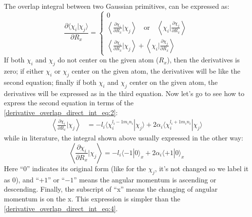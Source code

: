 The overlap integral between two Gaussian primitives, can be expressed as:
\begin{equation}
 \label{derivative_overlap_direct_int_eq:3}
\frac{\partial\langle\chi_{i}|\chi_{j}\rangle}{\partial R_{x}} = 
\begin{cases}
 0  \\
\left\langle \frac{\partial \chi_{i} }{\partial R_{x}}|\chi_{j}\right\rangle \quad \text{or}
\quad \left\langle \chi_{i}|\frac{\partial \chi_{j} }{\partial R_{x}}\right\rangle \\
\left\langle \frac{\partial \chi_{i} }{\partial R_{x}}|\chi_{j}\right\rangle +
\left\langle \chi_{i}|\frac{\partial \chi_{j} }{\partial R_{x}}\right\rangle
\end{cases}
\end{equation}
If both $\chi_{i}$ and $\chi_{j}$ do not center on the given atom ($R_{x}$), then the derivatives
is zero; if either $\chi_{i}$ or $\chi_{j}$ center on the given atom, the derivatives will be like
the second equation; finally if both $\chi_{i}$ and $\chi_{j}$ center on the given atom, the 
derivatives will be expressed as in the third equation. Now let's go to see how to express the 
second equation in terms of the \ref{derivative_overlap_direct_int_eq:2}:
\begin{equation}
 \begin{split}
  \left\langle \frac{\partial \chi_{i} }{\partial R_{x}}|\chi_{j}\right\rangle &=
-l_{i}\langle\chi_{i}^{l_{i}-1m_{i}n_{i}}|\chi_{j}\rangle
+2\alpha_{i}\langle\chi_{i}^{l_{i}+1m_{i}n_{i}}|\chi_{j}\rangle
 \end{split}
\label{derivative_overlap_direct_int_eq:4}
\end{equation}
while in literature, the integral shown above usually expressed in the other way:
\begin{equation}
 \label{derivative_overlap_direct_int_eq:5}
\left\langle \frac{\partial \chi_{i} }{\partial R_{x}}|\chi_{j}\right\rangle
= -l_{i}\langle -1|0\rangle_{x} + 2\alpha_{i}\langle +1 | 0\rangle_{x}
\end{equation}
Here ``0'' indicates its original form (like for the $\chi_{j}$, it's not changed so we label it
as 0), and ``$+1$'' or ``$-1$'' means the angular momentum is ascending or descending. Finally,
the subscript of ``x'' means the changing of angular momentum is on the x. This expression is 
simpler than the \ref{derivative_overlap_direct_int_eq:4}. 

